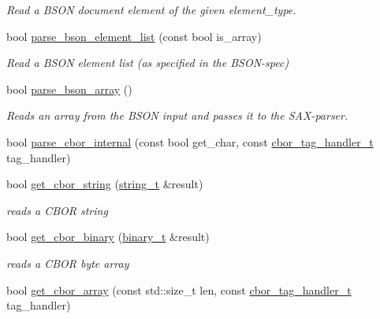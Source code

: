 \begin{DoxyCompactItemize}
\begin{DoxyCompactList}\small\item\em Read a B\+S\+ON document element of the given {\itshape element\+\_\+type}. \end{DoxyCompactList}\item 
bool \hyperlink{classnlohmann_1_1detail_1_1binary__reader_a4e07b75ccb2579d0e738b894f0fd8cf8}{parse\+\_\+bson\+\_\+element\+\_\+list} (const bool is\+\_\+array)
\begin{DoxyCompactList}\small\item\em Read a B\+S\+ON element list (as specified in the B\+S\+O\+N-\/spec) \end{DoxyCompactList}\item 
bool \hyperlink{classnlohmann_1_1detail_1_1binary__reader_a23eb89a222e22533e9fd43e76722f44f}{parse\+\_\+bson\+\_\+array} ()
\begin{DoxyCompactList}\small\item\em Reads an array from the B\+S\+ON input and passes it to the S\+A\+X-\/parser. \end{DoxyCompactList}\item 
bool \hyperlink{classnlohmann_1_1detail_1_1binary__reader_a4e4accd5a2a41bfb2f18a8a0fcc9421c}{parse\+\_\+cbor\+\_\+internal} (const bool get\+\_\+char, const \hyperlink{namespacenlohmann_1_1detail_a58bb1ef1a9ad287a9cfaf1855784d9ac}{cbor\+\_\+tag\+\_\+handler\+\_\+t} tag\+\_\+handler)
\item 
bool \hyperlink{classnlohmann_1_1detail_1_1binary__reader_a545a44ae4b3fa2b7a61d9e8517fb7154}{get\+\_\+cbor\+\_\+string} (\hyperlink{classnlohmann_1_1detail_1_1binary__reader_a823c244e5dbf1a8edae40819f9434237}{string\+\_\+t} \&result)
\begin{DoxyCompactList}\small\item\em reads a C\+B\+OR string \end{DoxyCompactList}\item 
bool \hyperlink{classnlohmann_1_1detail_1_1binary__reader_acb001d18095dc5bcf7336ae5122b8340}{get\+\_\+cbor\+\_\+binary} (\hyperlink{classnlohmann_1_1detail_1_1binary__reader_acf127bb88e4147fb692edabc2a0f0663}{binary\+\_\+t} \&result)
\begin{DoxyCompactList}\small\item\em reads a C\+B\+OR byte array \end{DoxyCompactList}\item 
bool \hyperlink{classnlohmann_1_1detail_1_1binary__reader_a3750658328bf3ec3cf23f1626f9ec3af}{get\+\_\+cbor\+\_\+array} (const std\+::size\+\_\+t len, const \hyperlink{namespacenlohmann_1_1detail_a58bb1ef1a9ad287a9cfaf1855784d9ac}{cbor\+\_\+tag\+\_\+handler\+\_\+t} tag\+\_\+handler)

\end{DoxyCompactItemize}
